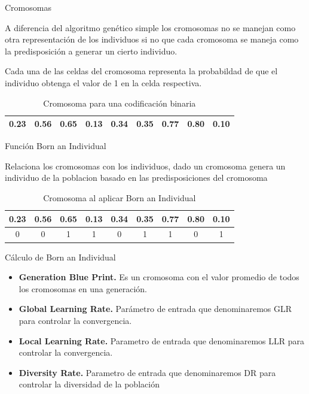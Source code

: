 \documentclass[10pt]{beamer}
\begin{document}
\begin{frame}{Cromosomas}

	A diferencia del algoritmo genético simple los cromosomas no se manejan
	como otra representación de los individuos si no que cada cromosoma se maneja
	como la \alert{predisposición} a generar un cierto individuo.
	
	Cada una de las celdas del cromosoma representa la probabildad de que el
	individuo obtenga el valor de 1 en la celda respectiva.

	\begin{table}
 		\caption{Cromosoma para una codificación binaria}
 		\begin{tabular}[t]{|c|c|c|c|c|c|c|c|c|}
			\hline
			0.23 & 0.56 & 0.65 & 0.13 & 0.34 & 0.35 & 0.77 & 0.80 & 0.10\\
			\hline
		\end{tabular}
 	\end{table}
	

\end{frame}

\begin{frame}{Función Born an Individual}

	Relaciona los cromosomas con los individuos, dado un cromosoma genera
	un individuo de la poblacion basado en las predisposiciones del cromosoma

	\begin{table}
 		\caption{Cromosoma al aplicar Born an Individual}
 		\begin{tabular}[t]{|c|c|c|c|c|c|c|c|c|}
			\hline
			0.23 & 0.56 & 0.65 & 0.13 & 0.34 & 0.35 & 0.77 & 0.80 & 0.10\\
			\hline
			0 & 0 & 1 & 1 & 0 & 1 & 1 & 0 & 1\\
			\hline
		\end{tabular}
 	\end{table}

\end{frame}


\begin{frame}{Cálculo de Born an Individual}

	\begin{itemize}[<+- | alert@+>]
	
	\item \textbf{Generation Blue Print.} Es un cromosoma con el valor promedio
	de todos los cromosomas en una generación.
	
	\item \textbf{Global Learning Rate.} Parámetro de entrada que denominaremos
	\alert{GLR} para controlar la convergencia.
	
	\item \textbf{Local Learning Rate.} Parametro de entrada que denominaremos
	\alert{LLR} para controlar la convergencia.
	
	\item \textbf{Diversity Rate.} Parametro de entrada que denominaremos
	\alert{DR} para controlar la diversidad de la población
	
	\end{itemize}

\end{frame}
\end{document}

